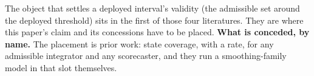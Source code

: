 The object that settles a deployed interval's validity (the admissible set around the deployed
threshold) sits in the first of those four literatures. They are where this paper's claim and
its concessions have to be placed. \textbf{What is conceded, by name.}
The placement is prior work:
\citet[Thm.~1, Prop.~2]{angelopoulos2023pid} state coverage, with a rate, for any admissible
integrator and any scorecaster, and they run a smoothing-family model in that slot themselves.
